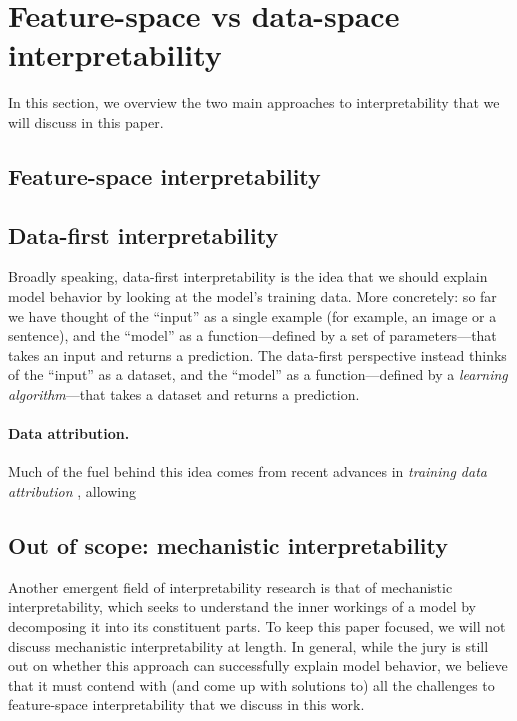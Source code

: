 \documentclass{article}
\begin{document}
\section{Feature-space vs data-space interpretability}
In this section, we overview the two main approaches to interpretability
that we will discuss in this paper.

\subsection{Feature-space interpretability}

\subsection{Data-first interpretability}
Broadly speaking, data-first interpretability is the idea that we should
explain model behavior by looking at the model's training data.
More concretely: so far we have thought of the ``input'' as a single example
(for example, an image or a sentence), and the ``model'' as a function---defined 
by a set of parameters---that takes an input and returns a prediction.
The data-first perspective instead thinks of the ``input'' as 
a dataset, and the ``model'' as a function---defined by a {\em learning
algorithm}---that takes a dataset and returns a prediction.

\paragraph{Data attribution.} Much of the fuel behind this idea comes from
recent advances in {\em training data attribution} \citep{}, allowing 

\subsection{Out of scope: mechanistic interpretability}
Another emergent field of interpretability research is that of mechanistic interpretability,
which seeks to understand the inner workings of a model by decomposing it into its 
constituent parts.
To keep this paper focused, we will not discuss mechanistic interpretability 
at length.
In general, while the jury is still out on whether this approach can successfully 
explain model behavior, we believe that it must contend with 
(and come up with solutions to)
all the challenges to feature-space interpretability 
that we discuss in this work.
\end{document}
